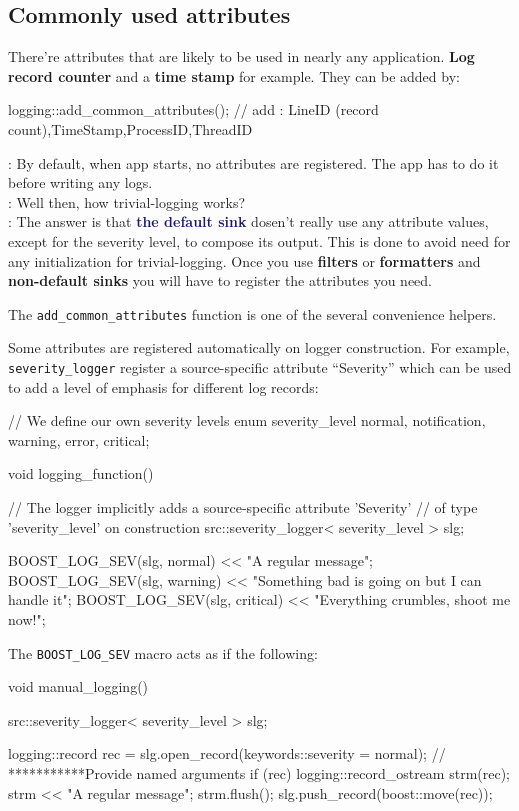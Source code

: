 \documentclass[dvipsnames]{article}
\newcommand{\mycola}{MidnightBlue}
\newcommand{\Cola}[1]{\textcolor{\mycola}{\textbf{#1}}}
\begin{document}
\subsection{Commonly used attributes}

There're attributes that are likely to be used in nearly any application. \textbf{Log
  record counter} and a \textbf{time stamp} for example. They can be added by:
\begin{simplec}
  logging::add_common_attributes();
  // add : LineID (record count),TimeStamp,ProcessID,ThreadID
\end{simplec}

\begin{tcolorbox}
   : By default, when app starts, no attributes are registered.
  The app has to do it before writing any logs.\\
   : Well then, how trivial-logging works?\\
   : The answer is that \Cola{the default sink} dosen't really use
  any attribute values, except for the severity level, to compose its output.
  This is done to avoid need for any initialization for trivial-logging. Once
  you use \textbf{filters} or \textbf{formatters} and \textbf{non-default sinks}
  you will have to register the attributes you need.
\end{tcolorbox}

The \verb|add_common_attributes| function is one of the several convenience
helpers.

Some attributes are registered automatically on logger construction. For
example, \verb|severity_logger| register a source-specific attribute
``Severity'' which can be used to add a level of emphasis for different log
records:
\begin{simplec}
  // We define our own severity levels
  enum severity_level {normal, notification, warning, error, critical};

  void logging_function(){
    // The logger implicitly adds a source-specific attribute 'Severity'
    // of type 'severity_level' on construction
    src::severity_logger< severity_level > slg;

    BOOST_LOG_SEV(slg, normal) << "A regular message";
    BOOST_LOG_SEV(slg, warning) << "Something bad is going on but I can handle it";
    BOOST_LOG_SEV(slg, critical) << "Everything crumbles, shoot me now!";
  }
\end{simplec}
The \verb|BOOST_LOG_SEV| macro acts as if the following:
\begin{simplec}
  void manual_logging(){
    src::severity_logger< severity_level > slg;

    logging::record rec = slg.open_record(keywords::severity = normal);
    //                        ***********Provide named arguments
    if (rec){
      logging::record_ostream strm(rec);
      strm << "A regular message";
      strm.flush();
      slg.push_record(boost::move(rec));
    }
  }
\end{simplec}
\end{document}
